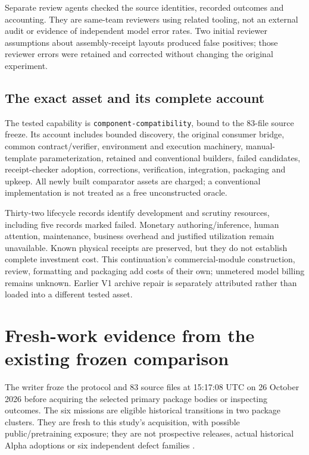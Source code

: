 \documentclass[11pt,letterpaper]{article}
\begin{document}
Separate review agents checked the source identities, recorded outcomes and accounting. They are same-team reviewers using related tooling, not an external audit or evidence of independent model error rates. Two initial reviewer assumptions about assembly-receipt layouts produced false positives; those reviewer errors were retained and corrected without changing the original experiment.

\subsection{The exact asset and its complete account}
The tested capability is \texttt{component-compatibility}, bound to the 83-file source freeze. Its account includes bounded discovery, the original consumer bridge, common contract/verifier, environment and execution machinery, manual-template parameterization, retained and conventional builders, failed candidates, receipt-checker adoption, corrections, verification, integration, packaging and upkeep. All newly built comparator assets are charged; a conventional implementation is not treated as a free unconstructed oracle.

Thirty-two lifecycle records identify development and scrutiny resources, including five records marked failed. Monetary authoring/inference, human attention, maintenance, business overhead and justified utilization remain unavailable. Known physical receipts are preserved, but they do not establish complete investment cost. This continuation's commercial-module construction, review, formatting and packaging add costs of their own; unmetered model billing remains unknown. Earlier V1 archive repair is separately attributed rather than loaded into a different tested asset.

\section{Fresh-work evidence from the existing frozen comparison}
The writer froze the protocol and 83 source files at 15:17:08 UTC on 26 October 2026 before acquiring the selected primary package bodies or inspecting outcomes. The six missions are eligible historical transitions in two package clusters. They are fresh to this study's acquisition, with possible public/pretraining exposure; they are not prospective releases, actual historical Alpha adoptions or six independent defect families \cite{freeze}.
\end{document}
